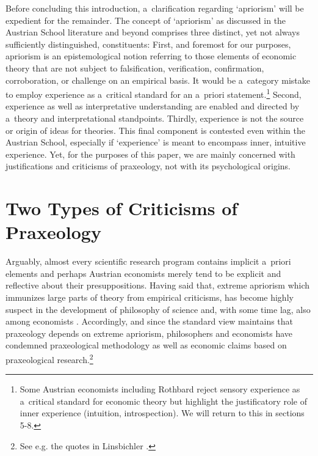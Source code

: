 Before concluding this introduction, a~clarification regarding ‘apriorism' will be expedient for the remainder. The concept of ‘apriorism' as discussed in the Austrian School literature and beyond comprises three distinct, yet not always sufficiently distinguished, constituents: First, and foremost for our purposes, apriorism is an epistemological notion referring to those elements of economic theory that are not subject to falsification, verification, confirmation, corroboration, or challenge on an empirical basis. It would be a~category mistake to employ experience as a~critical standard for an a~priori statement.\footnote{Some Austrian economists including Rothbard reject sensory experience as a~critical standard for economic theory but highlight the justificatory role of inner experience (intuition, introspection). We will return to this in sections 5-8.} Second, experience as well as interpretative understanding are enabled and directed by a~theory and interpretational standpoints. Thirdly, experience is not the source or origin of ideas for theories. This final component is contested even within the Austrian School, especially if ‘experience' is meant to encompass inner, intuitive experience. Yet, for the purposes of this paper, we are mainly concerned with justifications and criticisms of praxeology, not with its psychological origins.



\section{Two Types of Criticisms of Praxeology}

Arguably, almost every scientific research program contains implicit a~priori elements and perhaps Austrian economists merely tend to be explicit and reflective about their presuppositions. Having said that, extreme apriorism which immunizes large parts of theory from empirical criticisms, has become highly suspect in the development of philosophy of science and, with some time lag, also among economists 
\parencite[][]{scheall_rise_2023}. %
 Accordingly, and since the standard view maintains that praxeology depends on extreme apriorism, philosophers and economists have condemned praxeological methodology as well as economic claims based on praxeological research.\footnote{See e.g. the quotes in Linsbichler 
\parencite*[][p.3360]{linsbichler_austrian_2021}.%
}



